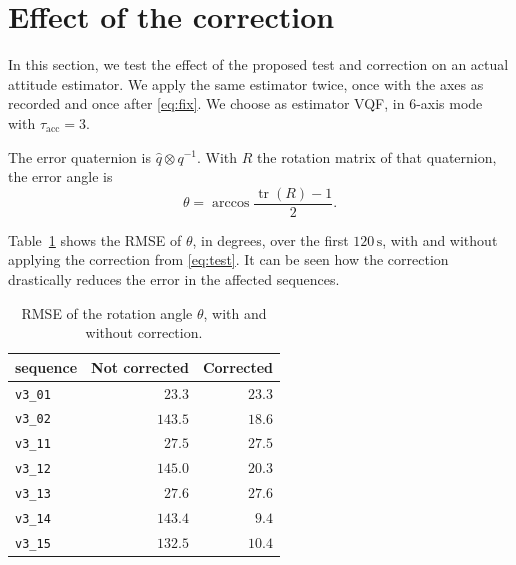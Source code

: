 \documentclass[11pt]{article}
\begin{document}
\section{Effect of the correction}
In this section, we test the effect of the proposed test and correction on an actual attitude
estimator.
We apply the same estimator twice, once with the axes as recorded and once after \eqref{eq:fix}.
We choose as estimator VQF, in 6-axis mode with $\tau_{\mathrm{acc}}=3$.

The error quaternion is $\hat{q}\otimes q^{-1}$.
With $R$ the rotation matrix of that quaternion, the error angle is
\begin{equation}
  \theta = \arccos\frac{\operatorname{tr}(R)-1}{2}.
  \label{eq:angle}
\end{equation}

Table~\ref{table:rmse_angle} shows the RMSE of $\theta$, in degrees,
over the first $120\,\mathrm{s}$, with and without applying the
correction from \eqref{eq:test}. It can be seen how the correction
drastically reduces the error in the affected sequences.

\begin{table}[h]
  \centering
  \caption{RMSE of the rotation angle $\theta$, with and without correction.}
  \label{table:rmse_angle}
  \begin{tabular}{lrr}
    \toprule
    sequence & Not corrected & Corrected \\
    \midrule
    \texttt{v3\_01} & $23.3$ & $23.3$ \\
    \texttt{v3\_02} & $143.5$ & $18.6$ \\
    \texttt{v3\_11} & $27.5$ & $27.5$ \\
    \texttt{v3\_12} & $145.0$ & $20.3$ \\
    \texttt{v3\_13} & $27.6$ & $27.6$ \\
    \texttt{v3\_14} & $143.4$ & $9.4$ \\
    \texttt{v3\_15} & $132.5$ & $10.4$ \\
    \bottomrule
  \end{tabular}
\end{table}
\end{document}
